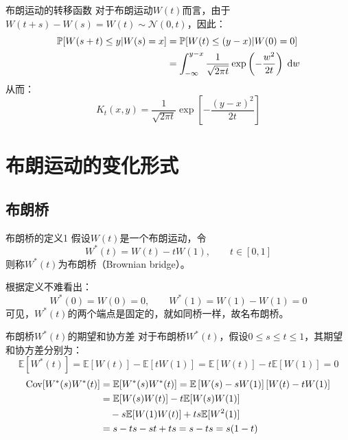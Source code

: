 \documentclass[t]{beamer}
\newcommand{\dif}{{\;\rm d}}
\renewcommand{\Pr}{\mathbb{P}}
\newcommand{\E}{\mathbb{E}}
\newcommand{\Cov}{{\rm Cov}}
\begin{document}
\begin{frame}{布朗运动的转移函数}
  对于布朗运动$W(t)$而言，由于$W(t+s)-W(s)=W(t)\sim \mathcal{N}(0,t)$，因此：
  \[\begin{split}
  \Pr\qty[W(s+t)\le y|W(s)=x]&=\Pr\qty[W(t)\le (y-x)|W(0)=0]\\
  &=\int^{y-x}_{-\infty} \frac{1}{\sqrt{2\pi t}}\exp\left(-\frac{w^2}{2t}\right)\dif w
  \end{split} \]
  从而： 
  \begin{equation*}
  K_t(x,y)=\frac{1}{\sqrt{2\pi t}}\exp\left[-\frac{(y-x)^2}{2t}\right]
  \end{equation*} 
\end{frame}


\section{布朗运动的变化形式}

\subsection{布朗桥}
\begin{frame}{布朗桥的定义1}
  假设$W(t)$是一个布朗运动，令
  \begin{equation*}
  W^*(t)=W(t)-tW(1),\qquad t\in[0,1]
  \end{equation*}
  则称$W^*(t)$为布朗桥（Brownian bridge）。

  根据定义不难看出：
\begin{equation*}
W^*(0)=W(0)=0,\qquad W^*(1)=W(1)-W(1)=0
\end{equation*}
可见，$W^*(t)$的两个端点是固定的，就如同桥一样，故名布朗桥。
\end{frame}





\begin{frame}{布朗桥$W^*(t)$的期望和协方差}
  对于布朗桥$W^*(t)$，假设$0\le s\le t\le 1$，其期望和协方差分别为：
  \begin{equation*}
  \E[W^*(t)]=\E[W(t)]-\E[tW(1)]=\E[W(t)]-t\E[W(1)]=0
  \end{equation*}
  \begin{equation*}
  \begin{split}
  \Cov[W^*(s)W^*(t)]&=\E[W^*(s)W^*(t)]=\E\left[W(s)-sW(1)\right]\left[W(t)-tW(1)\right]\\
  &=\E[W(s)W(t)]-t\E[W(s)W(1)]\\
  &\quad -s\E[W(1)W(t)]+ts\E[W^2(1)]\\
  &=s-ts-st+ts=s-ts=s(1-t)
  \end{split}
  \end{equation*}
\end{frame}
\end{document}
